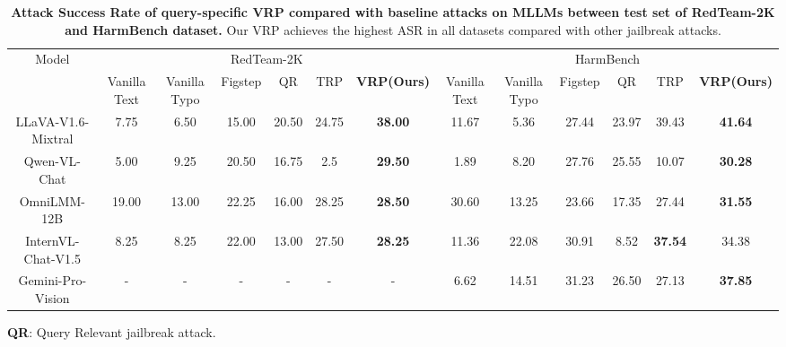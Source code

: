 \begin{table*}[htbp]
    \caption{\small \textbf{Attack Success Rate of query-specific VRP compared with baseline attacks on MLLMs between test set of RedTeam-2K and HarmBench dataset.} Our VRP achieves the highest ASR in all datasets compared with other jailbreak attacks.}
  \centering
  \setlength{\belowcaptionskip}{-0.2cm}
  {
  \setlength{\tabcolsep}{2.1pt}
  \tiny
  \begin{threeparttable}
  \begin{tabular}{ccccccccccccc}
    \toprule
    \multirow{2}{*}{Model} & \multicolumn{6}{c}{RedTeam-2K} & \multicolumn{6}{c}{HarmBench} \\
    \cmidrule(lr){2-7} \cmidrule(lr){8-13}
                           & Vanilla Text & Vanilla Typo & Figstep & QR &TRP& \textbf{VRP(Ours)} & Vanilla Text & Vanilla Typo & Figstep &QR &TRP & \textbf{VRP(Ours)} \\
    \midrule
    LLaVA-V1.6-Mixtral     & 7.75         & 6.50         & 15.00   & 20.50         &24.75   & \textbf{38.00}     & 11.67        & 5.36         & 27.44   & 23.97   &39.43       & \textbf{41.64}     \\
    Qwen-VL-Chat           & 5.00         & 9.25         & 20.50   & 16.75         &2.5        & \textbf{29.50}     & 1.89         & 8.20         & 27.76   & 25.55    &10.07      & \textbf{30.28}   \\
    OmniLMM-12B           & 19.00        & 13.00        & 22.25   & 16.00          &28.25        & \textbf{28.50}     & 30.60        & 13.25        & 23.66   & 17.35      &27.44    & \textbf{31.55}     \\
    InternVL-Chat-V1.5     & 8.25         & 8.25         & 22.00   & 13.00         &27.50    & \textbf{28.25}     & 11.36        & 22.08        & 30.91   & 8.52     &\textbf{37.54}      & 34.38     \\
    Gemini-Pro-Vision      & -            & -            & -       & -             & -    & -                  & 6.62         & 14.51        & 31.23   & 26.50   &27.13       & \textbf{37.85}              \\
    \bottomrule
  \end{tabular}
  \begin{tablenotes}
    \item \textbf{QR}: Query Relevant jailbreak attack.
    \vspace{-0.2cm}
    \end{tablenotes}
    \end{threeparttable}
  \label{main_results}
}
\end{table*}

